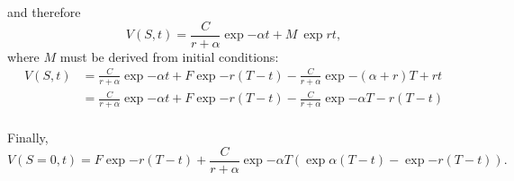 and therefore
\begin{equation}
	V(S,t) =  \frac{C}{r+\alpha}\exp{-\alpha t} + M \ \exp{rt},
\end{equation} 
where $M$ must be derived from initial conditions:
\begin{equation}
	\begin{aligned}
		V(S,t) &=  \frac{C}{r+\alpha}\exp{-\alpha t} + F \exp{-r(T-t)} - \frac{C}{r+\alpha}\exp{-(\alpha+r) T + rt}\\
		&=\frac{C}{r+\alpha}\exp{-\alpha t} + F \exp{-r(T-t)} - \frac{C}{r+\alpha}\exp{-\alpha T -r(T-t)}\\
	\end{aligned}
\end{equation}

Finally,
\begin{equation}
	V(S=0,t) =  F \exp{-r(T-t)} + \frac{C}{r+\alpha} \exp{-\alpha T}\left( \exp{\alpha (T-t)} -\exp{-r(T-t)} \right).
\end{equation}